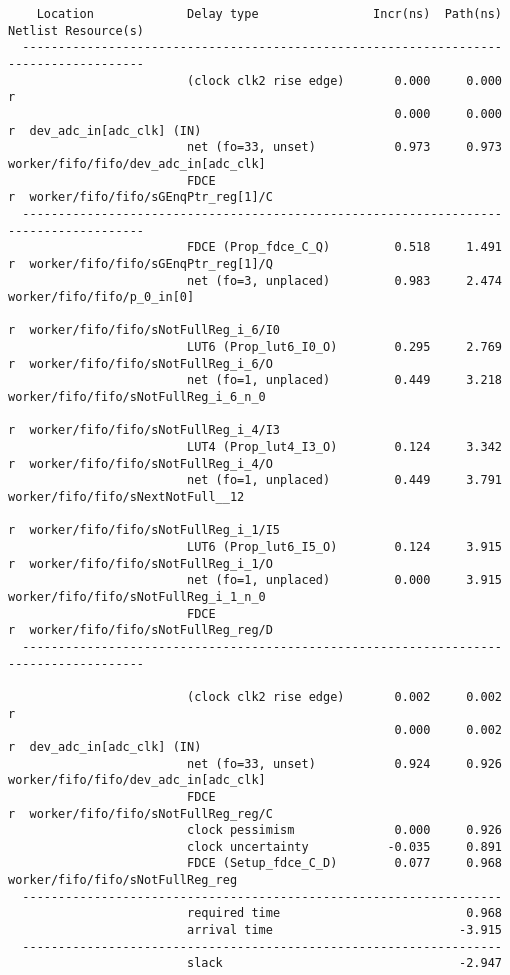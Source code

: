 \documentclass{article}
\begin{document}
\begin{lstlisting}
    Location             Delay type                Incr(ns)  Path(ns)    Netlist Resource(s)
  -------------------------------------------------------------------    -------------------
                         (clock clk2 rise edge)       0.000     0.000 r  
                                                      0.000     0.000 r  dev_adc_in[adc_clk] (IN)
                         net (fo=33, unset)           0.973     0.973    worker/fifo/fifo/dev_adc_in[adc_clk]
                         FDCE                                         r  worker/fifo/fifo/sGEnqPtr_reg[1]/C
  -------------------------------------------------------------------    -------------------
                         FDCE (Prop_fdce_C_Q)         0.518     1.491 r  worker/fifo/fifo/sGEnqPtr_reg[1]/Q
                         net (fo=3, unplaced)         0.983     2.474    worker/fifo/fifo/p_0_in[0]
                                                                      r  worker/fifo/fifo/sNotFullReg_i_6/I0
                         LUT6 (Prop_lut6_I0_O)        0.295     2.769 r  worker/fifo/fifo/sNotFullReg_i_6/O
                         net (fo=1, unplaced)         0.449     3.218    worker/fifo/fifo/sNotFullReg_i_6_n_0
                                                                      r  worker/fifo/fifo/sNotFullReg_i_4/I3
                         LUT4 (Prop_lut4_I3_O)        0.124     3.342 r  worker/fifo/fifo/sNotFullReg_i_4/O
                         net (fo=1, unplaced)         0.449     3.791    worker/fifo/fifo/sNextNotFull__12
                                                                      r  worker/fifo/fifo/sNotFullReg_i_1/I5
                         LUT6 (Prop_lut6_I5_O)        0.124     3.915 r  worker/fifo/fifo/sNotFullReg_i_1/O
                         net (fo=1, unplaced)         0.000     3.915    worker/fifo/fifo/sNotFullReg_i_1_n_0
                         FDCE                                         r  worker/fifo/fifo/sNotFullReg_reg/D
  -------------------------------------------------------------------    -------------------

                         (clock clk2 rise edge)       0.002     0.002 r  
                                                      0.000     0.002 r  dev_adc_in[adc_clk] (IN)
                         net (fo=33, unset)           0.924     0.926    worker/fifo/fifo/dev_adc_in[adc_clk]
                         FDCE                                         r  worker/fifo/fifo/sNotFullReg_reg/C
                         clock pessimism              0.000     0.926    
                         clock uncertainty           -0.035     0.891    
                         FDCE (Setup_fdce_C_D)        0.077     0.968    worker/fifo/fifo/sNotFullReg_reg
  -------------------------------------------------------------------
                         required time                          0.968    
                         arrival time                          -3.915    
  -------------------------------------------------------------------
                         slack                                 -2.947    


\end{lstlisting}
\end{document}
